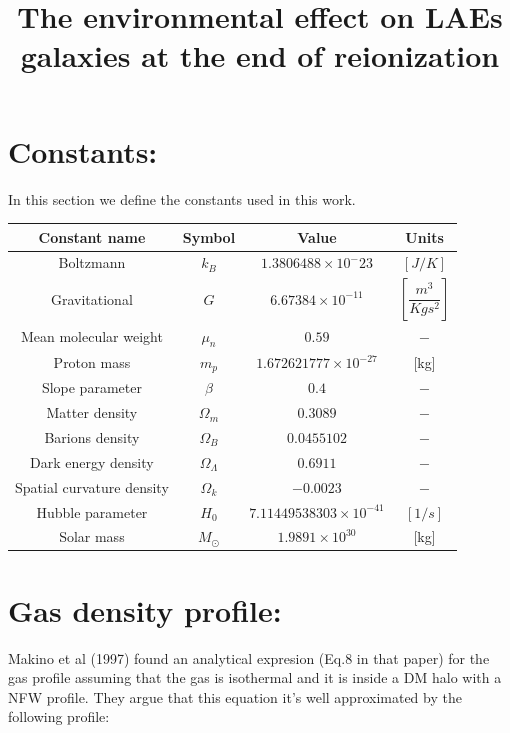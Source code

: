 \documentclass[12pt]{article}
\title{\begin{LARGE}
{The environmental effect on LAEs galaxies at the end of reionization}
\end{LARGE}}
\begin{document}
\maketitle

\section{Constants:}

In this section we define the constants used in this work.

\begin{table}[H]
\begin{center}
\begin{tabular}{c c c c}
\hline
Constant name & Symbol & Value & Units \\
\hline
\hline
Boltzmann  & $k_B$ & $1.3806488\times 10^-{23}$ & $[J/K]$ \\ 
Gravitational & $G$ & $6.67384\times 10^{-11}$ & $[\dfrac{m^3}{Kgs^2}]$\\
Mean molecular weight &$\mu_n$ & $0.59$ & $-$ \\
Proton mass & $m_p$ & $1.672621777\times 10^{-27}$ & [kg] \\
Slope parameter & $\beta$ & $0.4$ & $-$ \\
Matter density & $\Omega_m$ & $0.3089$ & $-$ \\ 
Barions density & $\Omega_B$ & $ 0.0455102$ & $-$ \\
Dark energy density & $\Omega_{\Lambda}$ & $0.6911$ & $-$ \\
Spatial curvature density& $\Omega_{k} $ & $-0.0023$ & $-$ \\
Hubble parameter & $H_0$ & $7.11449538303\times 10^{-41}$& $[1/s]$ \\
Solar mass &  $M_{\odot} $ & $1.9891\times 10^{30}$  & [kg] \\ 
\hline
\end{tabular}
\end{center}
\end{table}

\section{Gas density profile:}\label{sec:rho}

Makino et al (1997) found an analytical expresion (Eq.8 in that paper) for the gas profile assuming that the gas
is isothermal and it is inside a DM halo with a NFW profile. They argue that this equation it's well approximated by 
the following profile:
\end{document}
